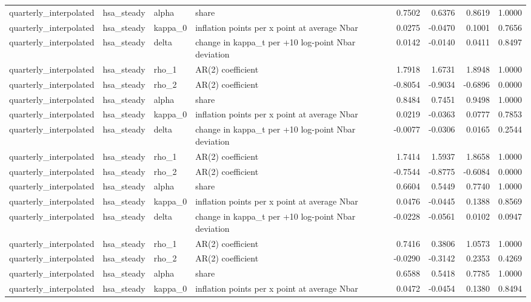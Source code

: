 \begin{tabular}{llllrrrr}
quarterly\_interpolated & hsa\_steady & alpha & share & 0.7502 & 0.6376 & 0.8619 & 1.0000 \\
quarterly\_interpolated & hsa\_steady & kappa\_0 & inflation points per x point at average Nbar & 0.0275 & -0.0470 & 0.1001 & 0.7656 \\
quarterly\_interpolated & hsa\_steady & delta & change in kappa\_t per +10 log-point Nbar deviation & 0.0142 & -0.0140 & 0.0411 & 0.8497 \\
quarterly\_interpolated & hsa\_steady & rho\_1 & AR(2) coefficient & 1.7918 & 1.6731 & 1.8948 & 1.0000 \\
quarterly\_interpolated & hsa\_steady & rho\_2 & AR(2) coefficient & -0.8054 & -0.9034 & -0.6896 & 0.0000 \\
quarterly\_interpolated & hsa\_steady & alpha & share & 0.8484 & 0.7451 & 0.9498 & 1.0000 \\
quarterly\_interpolated & hsa\_steady & kappa\_0 & inflation points per x point at average Nbar & 0.0219 & -0.0363 & 0.0777 & 0.7853 \\
quarterly\_interpolated & hsa\_steady & delta & change in kappa\_t per +10 log-point Nbar deviation & -0.0077 & -0.0306 & 0.0165 & 0.2544 \\
quarterly\_interpolated & hsa\_steady & rho\_1 & AR(2) coefficient & 1.7414 & 1.5937 & 1.8658 & 1.0000 \\
quarterly\_interpolated & hsa\_steady & rho\_2 & AR(2) coefficient & -0.7544 & -0.8775 & -0.6084 & 0.0000 \\
quarterly\_interpolated & hsa\_steady & alpha & share & 0.6604 & 0.5449 & 0.7740 & 1.0000 \\
quarterly\_interpolated & hsa\_steady & kappa\_0 & inflation points per x point at average Nbar & 0.0476 & -0.0445 & 0.1388 & 0.8569 \\
quarterly\_interpolated & hsa\_steady & delta & change in kappa\_t per +10 log-point Nbar deviation & -0.0228 & -0.0561 & 0.0102 & 0.0947 \\
quarterly\_interpolated & hsa\_steady & rho\_1 & AR(2) coefficient & 0.7416 & 0.3806 & 1.0573 & 1.0000 \\
quarterly\_interpolated & hsa\_steady & rho\_2 & AR(2) coefficient & -0.0290 & -0.3142 & 0.2353 & 0.4269 \\
quarterly\_interpolated & hsa\_steady & alpha & share & 0.6588 & 0.5418 & 0.7785 & 1.0000 \\
quarterly\_interpolated & hsa\_steady & kappa\_0 & inflation points per x point at average Nbar & 0.0472 & -0.0454 & 0.1380 & 0.8494 \\

\end{tabular}

